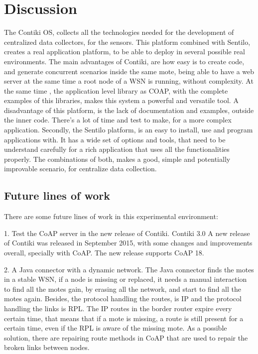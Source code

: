 \section{Discussion} \label{sec:Conclusion}

The Contiki OS,
	collects all the technologies needed for the development of centralized data collectors,
	for the sensors.
This platform combined with Sentilo,
	creates a real application platform,
	to be able to deploy in several possible real environments.
The main advantages of Contiki,
	are how easy is to create code,
	and generate concurrent scenarios inside the same mote,
	being able to have a web server at the same time a root node of a WSN is running,
	without complexity.
At the same time ,
	the application level library as COAP,
	with the complete examples of this libraries,
	makes this system a powerful and versatile tool.
A disadvantage of this platform,
	is the lack of documentation and examples,
	outside the inner code.
There's a lot of time and test to make,
	for a more complex application.
Secondly,
	the Sentilo platform,
	is an easy to install,
	use and program applications with.
It has a wide set of options and tools,
	that need to be understand carefully for a rich application that uses all the functionalities properly.
The combinations of both,
	makes a good,
	simple and potentially improvable scenario,
	for centralize data collection.

\subsection{Future lines of work}

There are some future lines of work in this experimental environment: 

1. Test the CoAP server in the new release of Contiki.
Contiki 3.0 A new release of Contiki was released in September 2015,
	with some changes and improvements overall,
	specially with CoAP.
The new release supports CoAP 18.

2. A Java connector with a dynamic network.
The Java connector finds the motes in a stable WSN,
	if a node is missing or replaced,
	it needs a manual interaction to find all the motes gain,
	by erasing all the network,
	and start to find all the motes again.
Besides,
	the protocol handling the routes,
	is IP and the protocol handling the links is RPL.
The IP routes in the border router expire every certain time,
	that means that if a mote is missing,
	a route is still present for a certain time,
	even if the RPL is aware of the missing mote.
As a possible solution,
	there are repairing route methods in CoAP that are used to repair the broken links between nodes.




